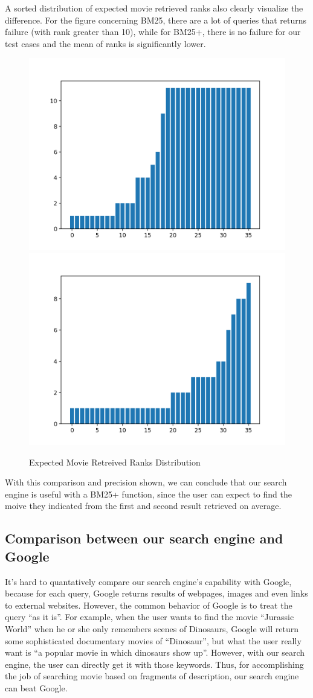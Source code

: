 \documentclass[sigconf,nonacm]{acmart}
\begin{document}
A sorted distribution of expected movie retrieved ranks also clearly visualize the difference.
For the figure concerning BM25, there are a lot of queries that returns failure (with rank greater than 10),
while for BM25+, there is no failure for our test cases and the mean of ranks is significantly lower.


\begin{figure}[H]
  \includegraphics[width=0.47\linewidth]{evaluation_1.png}
  \includegraphics[width=0.47\linewidth]{evaluation_2.png}
  \caption{Expected Movie Retreived Ranks Distribution}
\end{figure}

With this comparison and precision shown, we can conclude that our search engine is useful with a BM25+ function, 
since the user can expect to find the moive they indicated from the first and second result retrieved on average.

\subsection{Comparison between our search engine and Google}

It's hard to quantatively compare our search engine's capability with
Google, because for each query, Google returns results of webpages, images
and even links to external websites.
However, the common behavior of Google is to treat the query ``as it is''.
For example, when the user wants to find the movie ``Jurassic World'' when he or she only remembers
scenes of Dinosaurs, Google will return some sophisticated documentary
movies of ``Dinosaur'', but what the user really want is ``a popular movie in
which dinosaurs show up''. However, with our search engine, the user can directly get it with those keywords.
Thus, for accomplishing the job of searching movie based on fragments of description, our search engine
can beat Google.
\end{document}
